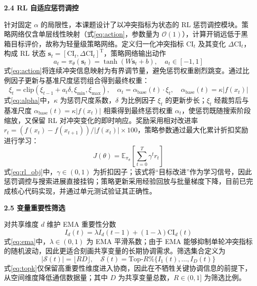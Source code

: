 \par
\indent
\textbf{2.4 RL 自适应惩罚调控}
\par
针对固定 $\alpha$ 的局限性，本课题设计了以冲突指标为状态的 RL 惩罚调控模块。策略网络仅含单层线性映射（式\eqref{eq:action}，参数量为 $\mathcal{O}(1)$），计算开销远低于黑箱目标评价，故称为轻量级策略网络。定义归一化冲突指标 $\mathrm{CI}_t$ 及其变化 $\Delta\mathrm{CI}_t$，构成 RL 状态 $\mathbf{s}_t=[\mathrm{CI}_t,\Delta\mathrm{CI}_t]^{\mathrm{T}}$，策略网络输出动作
\begin{equation}
\label{eq:action}
a_t=\pi_\theta(\mathbf{s}_t)=\tanh(W\mathbf{s}_t+b),\quad a_t\in[-1,1]
\end{equation}
式\eqref{eq:action}将连续冲突信息映射为有界调节量，避免惩罚权重剧烈跳变。通过比例因子更新与基准尺度惩罚组合得到最终权重：
\begin{equation}
\label{eq:alpha}
\xi_t=\mathrm{clip}(\xi_{t-1}+a_t\delta,\xi_{\min},\xi_{\max}),\quad
\alpha_t=\alpha_{\mathrm{base}}(t)\cdot\xi_t,\quad
\alpha_{\mathrm{base}}(t)=\kappa|f(x_t)|
\end{equation}
式\eqref{eq:alpha}中，$\kappa$ 为惩罚尺度系数，$\delta$ 为比例因子 $\xi_t$ 的更新步长；$\xi_t$ 经裁剪后与基准尺度 $\alpha_{\mathrm{base}}(t)=\kappa|f(x_t)|$ 相乘得到最终惩罚权重 $\alpha_t$，使惩罚既随搜索阶段缩放，又保留 RL 对冲突变化的即时响应。奖励采用相对改进率 $r_t=(f(x_t)-f(x_{t+1}))/|f(x_t)|\times 100$，策略参数通过最大化累计折扣奖励进行学习：
\begin{equation}
\label{eq:rl_obj}
J(\theta)=\mathbb{E}_{\pi_\theta}\left[\sum_{t=0}^{T}\gamma^{t} r_t\right]
\end{equation}
式\eqref{eq:rl_obj}中，$\gamma\in(0,1)$ 为折扣因子；该式将“目标改进”作为学习信号，因此惩罚调控与搜索进展直接挂钩；策略更新采用经验回放与批量梯度下降，目前已完成核心代码实现，并通过单元测试验证其正确性。

\par
\indent
\textbf{2.5 变量重要性筛选}
\par
对共享维度 $d$ 维护 EMA 重要性分数
\begin{equation}
\label{eq:ema}
I_d(t)=\lambda I_d(t-1)+(1-\lambda)\mathrm{CI}_d(t)
\end{equation}
式\eqref{eq:ema}中，$\lambda\in(0,1)$ 为 EMA 平滑系数；由于 EMA 能够抑制单轮冲突指标的随机波动，因此更适合刻画共享变量的长期协调需求。筛选集合定义为
\begin{equation}
\label{eq:topk}
|\mathcal{S}(t)|=\lfloor RD\rfloor,\quad
\mathcal{S}(t)=\mathrm{Top}\text{-}R\%\{I_1(t),\ldots,I_D(t)\}
\end{equation}
式\eqref{eq:topk}仅保留高重要性维度进入协商，因此在不牺牲关键协调信息的前提下，从空间维度降低通信数据量；其中 $D$ 为共享变量总数，$R\in(0,1]$ 为筛选比例。

